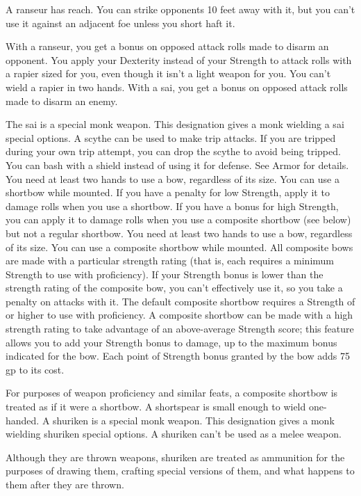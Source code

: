  A ranseur has reach. You can strike opponents 10 feet away with it, but you can't use it against an adjacent foe unless you short haft it.
\par With a ranseur, you get a  bonus on opposed attack rolls made to disarm an opponent.
 You apply your Dexterity instead of your Strength to attack rolls with a rapier sized for you, even though it isn't a light weapon for you. You can't wield a rapier in two hands.
 With a sai, you get a  bonus on opposed attack rolls made to disarm an enemy.
\par The sai is a special monk weapon. This designation gives a monk wielding a sai special options.
 A scythe can be used to make trip attacks. If you are tripped during your own trip attempt, you can drop the scythe to avoid being tripped.
 You can bash with a shield instead of using it for defense. See Armor for details.
 You need at least two hands to use a bow, regardless of its size. You can use a shortbow while mounted. If you have a penalty for low Strength, apply it to damage rolls when you use a shortbow. If you have a bonus for high Strength, you can apply it to damage rolls when you use a composite shortbow (see below) but not a regular shortbow.
 You need at least two hands to use a bow, regardless of its size. You can use a composite shortbow while mounted. All composite bows are made with a particular strength rating (that is, each requires a minimum Strength to use with proficiency). If your Strength bonus is lower than the strength rating of the composite bow, you can't effectively use it, so you take a  penalty on attacks with it. The default composite shortbow requires a Strength of  or higher to use with proficiency. A composite shortbow can be made with a high strength rating to take advantage of an above-average Strength score; this feature allows you to add your Strength bonus to damage, up to the maximum bonus indicated for the bow. Each point of Strength bonus granted by the bow adds 75 gp to its cost.
\par For purposes of weapon proficiency and similar feats, a composite shortbow is treated as if it were a shortbow.
 A shortspear is small enough to wield one-handed.
 A shuriken is a special monk weapon. This designation gives a monk wielding shuriken special options. A shuriken can't be used as a melee weapon.
\par Although they are thrown weapons, shuriken are treated as ammunition for the purposes of drawing them, crafting special versions of them, and what happens to them after they are thrown. 
